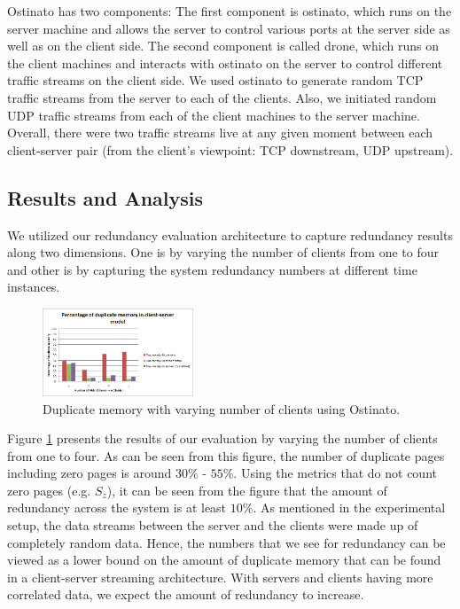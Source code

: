 \documentclass{acm_proc_article-sp}
\begin{document}
Ostinato has two components: The first component is ostinato, which runs on the server machine and allows the server to control various ports at the server side as well as on the client side. The second component is called drone, which runs on the client machines and interacts with ostinato on the server to control different traffic streams on the client side. We used ostinato to generate random TCP traffic streams from the server to each of the clients.  Also, we initiated random UDP traffic streams from each of the client machines to the server machine. Overall, there were two traffic streams live at any given moment between each client-server pair (from the client's viewpoint: TCP downstream, UDP upstream).

\subsection{Results and Analysis}
We utilized our redundancy evaluation architecture to capture redundancy results along two dimensions.  One is by varying the number of clients from one to four and other is by capturing the system redundancy numbers at different time instances.

\begin{figure}[htbp]
\centering
        \includegraphics[width=0.4\textwidth]{images/client-server1.png}
    \caption{Duplicate memory with varying number of clients using Ostinato.}
    \label{fig:client-server1}
\end{figure}

Figure \ref{fig:client-server1} presents the results of our evaluation by varying the number of clients from one to four.  As can be seen from this figure, the number of duplicate pages including zero pages is around $30$\% - $55$\%.	 Using the metrics that do not count zero pages (e.g. $S_z$), it can be seen from the figure that the amount of redundancy across the system is at least $10$\%. As mentioned in the experimental setup, the data streams between the server and the clients were made up of completely random data. Hence, the numbers that we see for redundancy can be viewed as a lower bound on the amount of duplicate memory that can be found in a client-server streaming architecture. With servers and clients having more correlated data, we expect the amount of redundancy to increase.
\end{document}
